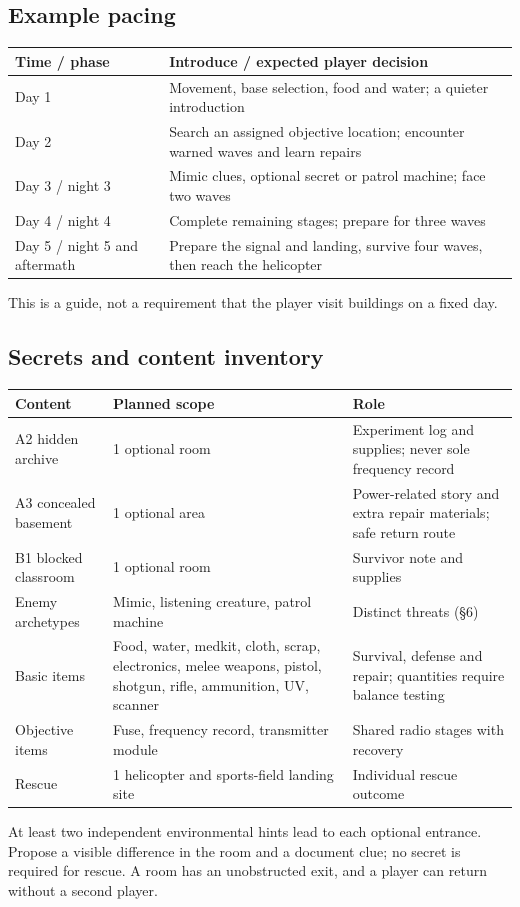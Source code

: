 \subsection{Example pacing}
\begin{longtable}{@{}p{}p{}@{}}
\toprule
\textbf{Time / phase} & \textbf{Introduce / expected player decision} \\ \midrule\endhead
Day 1 & Movement, base selection, food and water; a quieter introduction \\
Day 2 & Search an assigned objective location; encounter warned waves and learn repairs \\
Day 3 / night 3 & Mimic clues, optional secret or patrol machine; face two waves \\
Day 4 / night 4 & Complete remaining stages; prepare for three waves \\
Day 5 / night 5 and aftermath & Prepare the signal and landing, survive four waves, then reach the helicopter \\
\bottomrule
\end{longtable}
This is a guide, not a requirement that the player visit buildings on a fixed day.


\subsection{Secrets and content inventory}
\begin{longtable}{@{}p{}p{}p{}@{}}
\toprule
\textbf{Content} & \textbf{Planned scope} & \textbf{Role} \\ \midrule\endhead
A2 hidden archive & 1 optional room & Experiment log and supplies; never sole frequency record \\
A3 concealed basement & 1 optional area & Power-related story and extra repair materials; safe return route \\
B1 blocked classroom & 1 optional room & Survivor note and supplies \\
Enemy archetypes & Mimic, listening creature, patrol machine & Distinct threats (§6) \\
Basic items & Food, water, medkit, cloth, scrap, electronics, melee weapons, pistol, shotgun, rifle, ammunition, UV, scanner & Survival, defense and repair; quantities require balance testing \\
Objective items & Fuse, frequency record, transmitter module & Shared radio stages with recovery \\
Rescue & 1 helicopter and sports-field landing site & Individual rescue outcome \\
\bottomrule
\end{longtable}
At least two independent environmental hints lead to each optional entrance. Propose a visible difference in the room and a document clue; no secret is required for rescue. A room has an unobstructed exit, and a player can return without a second player.


